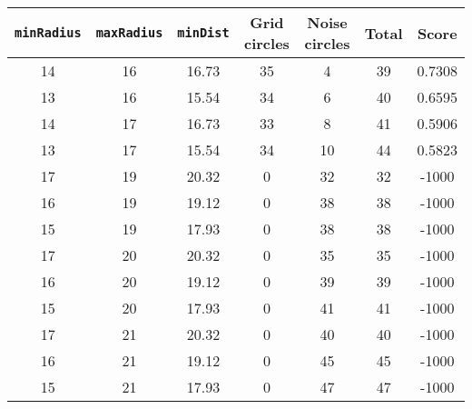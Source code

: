 \documentclass[letterpaper, 12pt]{article}
\begin{document}
\begin{longtable}{|c|c|c|c|c|c|c|}
\hline
\textbf{\texttt{minRadius}} & \textbf{\texttt{maxRadius}} & \textbf{\texttt{minDist}} & \textbf{Grid circles} & \textbf{Noise circles} & \textbf{Total} & \textbf{Score} \\
\hline
14 & 16 & 16.73 & 35 & 4 & 39 & 0.7308 \\
\hline
13 & 16 & 15.54 & 34 & 6 & 40 & 0.6595 \\
\hline
14 & 17 & 16.73 & 33 & 8 & 41 & 0.5906 \\
\hline
13 & 17 & 15.54 & 34 & 10 & 44 & 0.5823 \\
\hline
17 & 19 & 20.32 & 0 & 32 & 32 & -1000 \\
\hline
16 & 19 & 19.12 & 0 & 38 & 38 & -1000 \\
\hline
15 & 19 & 17.93 & 0 & 38 & 38 & -1000 \\
\hline
17 & 20 & 20.32 & 0 & 35 & 35 & -1000 \\
\hline
16 & 20 & 19.12 & 0 & 39 & 39 & -1000 \\
\hline
15 & 20 & 17.93 & 0 & 41 & 41 & -1000 \\
\hline
17 & 21 & 20.32 & 0 & 40 & 40 & -1000 \\
\hline
16 & 21 & 19.12 & 0 & 45 & 45 & -1000 \\
\hline
15 & 21 & 17.93 & 0 & 47 & 47 & -1000 \\
\hline
\end{longtable}
\end{document}
